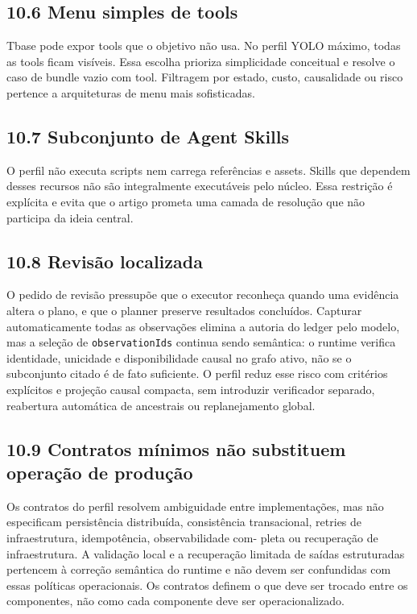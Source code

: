\documentclass[12pt,a4paper]{article}
\begin{document}
\subsection*{10.6 Menu simples de tools}

Tbase pode expor tools que o objetivo não usa. No perfil YOLO máximo, todas as tools ficam visíveis. Essa escolha prioriza simplicidade conceitual e resolve o caso de bundle vazio com tool. Filtragem por estado, custo, causalidade ou risco pertence a arquiteturas de menu mais sofisticadas.



\subsection*{10.7 Subconjunto de Agent Skills}

O perfil não executa scripts nem carrega referências e assets. Skills que dependem desses recursos não são integralmente executáveis pelo núcleo. Essa restrição é explícita e evita que o artigo prometa uma camada de resolução que não participa da ideia central.


\subsection*{10.8 Revisão localizada}

O pedido de revisão pressupõe que o executor reconheça quando uma evidência altera o plano, e que o planner preserve resultados concluídos. Capturar automaticamente todas as observações elimina a autoria do ledger pelo modelo, mas a seleção de \texttt{observationIds} continua sendo semântica: o runtime verifica identidade, unicidade e disponibilidade causal no grafo ativo, não se o subconjunto citado é de fato suficiente. O perfil reduz esse risco com critérios explícitos e projeção causal compacta, sem introduzir verificador separado, reabertura automática de ancestrais ou replanejamento global.


\subsection*{10.9 Contratos mínimos não substituem operação de produção}

Os contratos do perfil resolvem ambiguidade entre implementações, mas não especificam persistência distribuída, consistência transacional, retries de infraestrutura, idempotência, observabilidade com- pleta ou recuperação de infraestrutura. A validação local e a recuperação limitada de saídas estruturadas pertencem à correção semântica do runtime e não devem ser confundidas com essas políticas operacionais. Os contratos definem o que deve ser trocado entre os componentes, não como cada componente deve ser operacionalizado.
\end{document}
